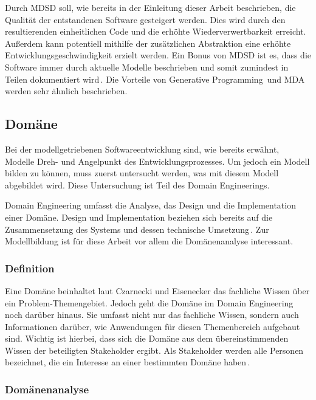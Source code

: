 \documentclass[12pt,oneside,a4paper,parskip]{scrbook}
\begin{document}
Durch MDSD soll, wie bereits in der Einleitung dieser Arbeit beschrieben, die Qualität der entstandenen Software gesteigert werden. Dies wird durch den resultierenden einheitlichen Code und die erhöhte Wiederverwertbarkeit erreicht. Außerdem kann potentiell mithilfe der zusätzlichen Abstraktion eine erhöhte Entwicklungsgeschwindigkeit erzielt werden. Ein Bonus von MDSD ist es, dass die Software immer durch aktuelle Modelle beschrieben und somit zumindest in Teilen dokumentiert wird\,\cite[S.\,13ff.]{stahl2007}. Die Vorteile von Generative Programming\,\cite[S.\,13ff.]{czaeis2000} und MDA\,\cite{mdaguide} werden sehr ähnlich beschrieben.

\subsection{Domäne}

Bei der modellgetriebenen Softwareentwicklung sind, wie bereits erwähnt, Modelle Dreh- und Angelpunkt des Entwicklungsprozesses. Um jedoch ein Modell bilden zu können, muss zuerst untersucht werden, was mit diesem Modell abgebildet wird. Diese Untersuchung ist Teil des Domain Engineerings.

Domain Engineering umfasst die Analyse, das Design und die Implementation einer Domäne. Design und Implementation beziehen sich bereits auf die Zusammensetzung des Systems und dessen technische Umsetzung\,\cite[S.\,21f.]{czaeis2000}. Zur Modellbildung ist für diese Arbeit vor allem die Domänenanalyse interessant.

\subsubsection{Definition}

Eine Domäne beinhaltet laut Czarnecki und Eisenecker das fachliche Wissen über ein Problem-Themengebiet. Jedoch geht die Domäne im Domain Engineering noch darüber hinaus. Sie umfasst nicht nur das fachliche Wissen, sondern auch Informationen darüber, wie Anwendungen für diesen Themenbereich aufgebaut sind. Wichtig ist hierbei, dass sich die Domäne aus dem übereinstimmenden Wissen der beteiligten Stakeholder ergibt. Als Stakeholder werden alle Personen bezeichnet, die ein Interesse an einer bestimmten Domäne haben\,\cite[S.\,33]{czaeis2000}.

\subsubsection{Domänenanalyse}
\end{document}
